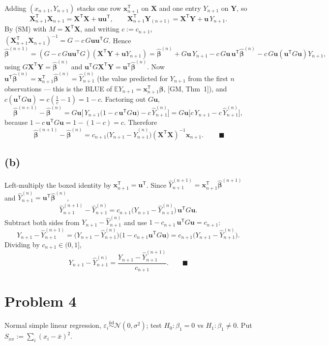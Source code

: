 \documentclass[11pt]{article}
\newcommand{\E}{\mathbb{E}}
\newcommand{\N}{\mathcal{N}}
\newcommand{\bX}{\mathbf{X}}
\newcommand{\bY}{\mathbf{Y}}
\newcommand{\bx}{\mathbf{x}}
\newcommand{\bu}{\mathbf{u}}
\newcommand{\bbeta}{\bm{\beta}}
\newcommand{\T}{^{\mathsf{T}}}
\newcommand{\inv}{^{-1}}
\newcommand{\Sxx}{S_{xx}}
\newcommand{\bhat}[1]{\widehat{#1}}
\theoremstyle{remark}
\begin{document}
Adding $(x_{n+1},Y_{n+1})$ stacks one row $\bx_{n+1}\T$ on $\bX$ and one entry $Y_{n+1}$ on $\bY$, so
\[
\bX_{n+1}\T\bX_{n+1}=\bX\T\bX+\bu\bu\T,\qquad
\bX_{n+1}\T\bY_{(n+1)}=\bX\T\bY+\bu\,Y_{n+1}.
\]
By (SM) with $M=\bX\T\bX$, and writing $c:=c_{n+1}$,
$(\bX_{n+1}\T\bX_{n+1})\inv=G-c\,G\bu\bu\T G$. Hence
\[
\bhat{\bbeta}^{(n+1)}=(G-c\,G\bu\bu\T G)(\bX\T\bY+\bu Y_{n+1})
=\bhat{\bbeta}^{(n)}+G\bu\,Y_{n+1}-c\,G\bu\,\bu\T\bhat{\bbeta}^{(n)}-c\,G\bu(\bu\T G\bu)Y_{n+1},
\]
using $G\bX\T\bY=\bhat{\bbeta}^{(n)}$ and $\bu\T G\bX\T\bY=\bu\T\bhat{\bbeta}^{(n)}$. Now
$\bu\T\bhat{\bbeta}^{(n)}=\bx_{n+1}\T\bhat{\bbeta}^{(n)}=\bhat Y^{(n)}_{n+1}$ (the value predicted for
$Y_{n+1}$ from the first $n$ observations --- this is the BLUE of
$\E Y_{n+1}=\bx_{n+1}\T\bbeta$, [GM, Thm~1]), and $c(\bu\T G\bu)=c(\tfrac1c-1)=1-c$. Factoring out $G\bu$,
\[
\bhat{\bbeta}^{(n+1)}-\bhat{\bbeta}^{(n)}
=G\bu\Big[\,Y_{n+1}\big(1-c\,\bu\T G\bu\big)-c\,\bhat Y^{(n)}_{n+1}\Big]
=G\bu\Big[c\,Y_{n+1}-c\,\bhat Y^{(n)}_{n+1}\Big],
\]
because $1-c\,\bu\T G\bu=1-(1-c)=c$. Therefore
\[
\boxed{\ \bhat{\bbeta}^{(n+1)}-\bhat{\bbeta}^{(n)}
=c_{n+1}\big(Y_{n+1}-\bhat Y^{(n)}_{n+1}\big)(\bX\T\bX)\inv\bx_{n+1}.\ } \qquad\blacksquare
\]

\subsection*{(b)}

Left-multiply the boxed identity by $\bx_{n+1}\T=\bu\T$. Since
$\bhat Y^{(n+1)}_{n+1}=\bx_{n+1}\T\bhat{\bbeta}^{(n+1)}$ and $\bhat Y^{(n)}_{n+1}=\bu\T\bhat{\bbeta}^{(n)}$,
\[
\bhat Y^{(n+1)}_{n+1}-\bhat Y^{(n)}_{n+1}
=c_{n+1}\big(Y_{n+1}-\bhat Y^{(n)}_{n+1}\big)\,\bu\T G\bu .
\]
Subtract both sides from $Y_{n+1}-\bhat Y^{(n)}_{n+1}$ and use $1-c_{n+1}\,\bu\T G\bu=c_{n+1}$:
\[
Y_{n+1}-\bhat Y^{(n+1)}_{n+1}
=\big(Y_{n+1}-\bhat Y^{(n)}_{n+1}\big)\big(1-c_{n+1}\bu\T G\bu\big)
=c_{n+1}\big(Y_{n+1}-\bhat Y^{(n)}_{n+1}\big).
\]
Dividing by $c_{n+1}\in(0,1]$,
\[
Y_{n+1}-\bhat Y^{(n)}_{n+1}=\frac{Y_{n+1}-\bhat Y^{(n+1)}_{n+1}}{c_{n+1}}. \qquad\blacksquare
\]

\section*{Problem 4}

Normal simple linear regression, $\varepsilon_i\overset{\text{iid}}{\sim}\N(0,\sigma^2)$; test
$H_0:\beta_1=0$ vs $H_1:\beta_1\ne0$. Put $\Sxx:=\sum_i(x_i-\bar x)^2$.
\end{document}
